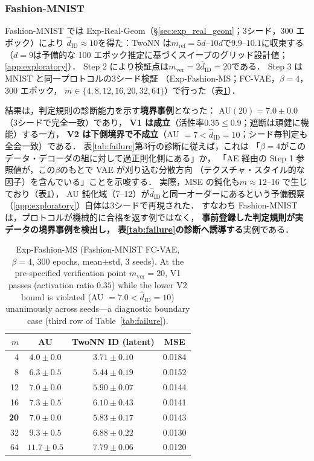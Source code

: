 \documentclass[11pt,a4paper]{jsarticle}
\newcommand{\hatdID}{\hat{d}_{\mathrm{ID}}}
\begin{document}
\subsubsection{Fashion-MNIST}\label{sec:exp_fashion}

Fashion-MNIST では Exp-Real-Geom（§\ref{sec:exp_real_geom}；3シード，300 エポック）により
$\hatdID \approx 10$を得た：TwoNN は$m_{\mathrm{ref}} = 5d$--$10d$で$9.9$--$10.1$に収束する
（$d = 9$は予備的な 100 エポック推定に基づくスイープのグリッド設計値；\ref{app:exploratory}）．
Step 2 により検証点は$m_{\mathrm{ver}} = 2\hatdID = 20$である．
Step 3 は MNIST と同一プロトコルの3シード検証
（Exp-Fashion-MS；FC-VAE，$\beta = 4$，300 エポック，
$m \in \{4, 8, 12, 16, 20, 32, 64\}$）で行った（表\ref{tab:fashion_s3}）．

結果は，判定規則の診断能力を示す\textbf{境界事例}となった：
AU$(20) = 7.0 \pm 0.0$（3シードで完全一致）であり，
\textbf{V1 は成立}（活性率$0.35 \leq 0.9$；遮断は頑健に機能）する一方，
\textbf{V2 は下側境界で不成立}（AU $= 7 < \hatdID = 10$；シード毎判定も全会一致）である．
表\ref{tab:failure}第3行の診断に従えば，これは
「$\beta = 4$がこのデータ・デコーダの組に対して過正則化側にある」か，
「AE 経由の Step 1 参照値が，この$\beta$のもとで VAE が刈り込む分散方向
（テクスチャ・スタイル的な因子）を含んでいる」ことを示唆する．
実際，MSE の鈍化も$m \approx 12$--16 で生じており（表\ref{tab:fashion_s3}），
AU 鈍化域（7--12）が$\hatdID$と同一オーダーにあるという予備観察
（\ref{app:exploratory}）自体は3シードで再現された．
すなわち Fashion-MNIST は，プロトコルが機械的に合格を返す例ではなく，
\textbf{事前登録した判定規則が実データの境界事例を検出し，
表\ref{tab:failure}の診断へ誘導する}実例である．

\begin{table}[H]
\centering
\caption{Exp-Fashion-MS (Fashion-MNIST FC-VAE, $\beta = 4$, 300 epochs,
mean$\pm$std, 3 seeds). At the pre-specified verification point
$m_{\mathrm{ver}} = 20$, V1 passes (activation ratio $0.35$) while the
lower V2 bound is violated (AU $= 7.0 < \hatdID = 10$) unanimously across
seeds---a diagnostic boundary case (third row of Table~\ref{tab:failure}).}
\label{tab:fashion_s3}
\small
\begin{tabular}{rccc}
\toprule
$m$ & AU & TwoNN ID (latent) & MSE \\
\midrule
 4 & $4.0 \pm 0.0$ & $3.71 \pm 0.10$ & 0.0184 \\
 8 & $6.3 \pm 0.5$ & $5.44 \pm 0.19$ & 0.0152 \\
12 & $7.0 \pm 0.0$ & $5.90 \pm 0.07$ & 0.0144 \\
16 & $7.3 \pm 0.5$ & $6.10 \pm 0.43$ & 0.0141 \\
\textbf{20} & $\boldsymbol{7.0 \pm 0.0}$ & $5.83 \pm 0.17$ & 0.0143 \\
32 & $9.3 \pm 0.5$ & $6.88 \pm 0.22$ & 0.0130 \\
64 & $11.7 \pm 0.5$ & $7.79 \pm 0.06$ & 0.0120 \\
\bottomrule
\end{tabular}
\end{table}
\end{document}
